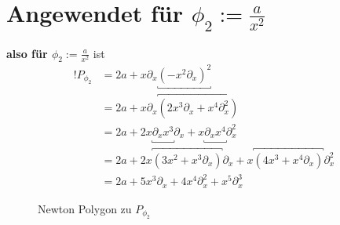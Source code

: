 \section{Angewendet für $\phi_2:=\frac{a}{x^2}$}
\begin{comment}
für $q=2$
%
\begin{align*}
P_{\phi}(x,\partial_x) &=(-x^2\partial_x)^2 (x\partial_x-1)+2a \\
  &=x^2\underbracket{\partial_xx^2}\partial_x(x\partial_x-1)+2a \\
  &=x^2\overbracket{(x^2\partial_x+2x)}\partial_x(x\partial_x-1)+2a \\
  &=(x^4\partial_x^2+2x^3\partial_x)(x\partial_x-1)+2a \\
  &=x^4\underbracket{\partial_x^2x}\partial_x
    +2x^3\underbracket{\partial_xx}\partial_x
    -x^4\partial_x^2-2x^3\partial_x+2a \\
  &=x^4\overbracket{(x\partial_x^2+2x)}\partial_x
    +2x^3\overbracket{(x\partial_x+1)}\partial_x
    -x^4\partial_x^2-2x^3\partial_x+2a \\
  &=x^5\partial_x^3+2x^5\partial_x +2x^4\partial_x^2 +2x^3\partial_x
    -x^4\partial_x^2-2x^3\partial_x+2a \\
  &=3x^5\partial_x^3 +x^4\partial_x^2 + 2a
\end{align*}
\end{comment}

\textbf{also für $\phi_2:=\frac{a}{x^2}$} ist
\begin{align*}                                                                       !
P_{\phi_2} &=2a+x\partial_x\underbracket{(-x^2\partial_x)^{2}}\\
           &=2a +x\partial_x \overbracket{(2x^3\partial_x+x^4\partial_x^2)} \\
           &=2a
             +2x\underbracket{\partial_xx^3}\partial_x
             +x\underbracket{\partial_xx^4}\partial_x^2 \\
           &=2a
             +2x\overbracket{(3x^2+x^3\partial_x)}\partial_x
             +x\overbracket{(4x^3+x^4\partial_x)}\partial_x^2 \\
           &=2a+5x^3\partial_x+4x^{4}\partial_x^2+x^5\partial_x^3
\end{align*}
\begin{figure}[H]
\caption{Newton Polygon zu $P_{\phi_2}$}
\begin{center}
\end{center}
\end{figure}

